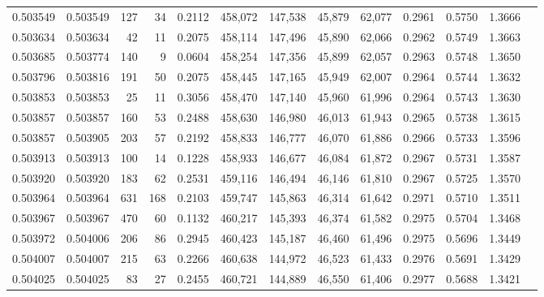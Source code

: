 \begin{tabular}{rrrrrrrrrrrrr}
0.503549 & 0.503549 &   127 &    34 &                                     0.2112 & 458,072 & 147,538 &  45,879 &  62,077 & 0.2961 & 0.5750 & 1.3666 \\
0.503634 & 0.503634 &    42 &    11 &                                     0.2075 & 458,114 & 147,496 &  45,890 &  62,066 & 0.2962 & 0.5749 & 1.3663 \\
0.503685 & 0.503774 &   140 &     9 &                                     0.0604 & 458,254 & 147,356 &  45,899 &  62,057 & 0.2963 & 0.5748 & 1.3650 \\
0.503796 & 0.503816 &   191 &    50 &                                     0.2075 & 458,445 & 147,165 &  45,949 &  62,007 & 0.2964 & 0.5744 & 1.3632 \\
0.503853 & 0.503853 &    25 &    11 &                                     0.3056 & 458,470 & 147,140 &  45,960 &  61,996 & 0.2964 & 0.5743 & 1.3630 \\
0.503857 & 0.503857 &   160 &    53 &                                     0.2488 & 458,630 & 146,980 &  46,013 &  61,943 & 0.2965 & 0.5738 & 1.3615 \\
0.503857 & 0.503905 &   203 &    57 &                                     0.2192 & 458,833 & 146,777 &  46,070 &  61,886 & 0.2966 & 0.5733 & 1.3596 \\
0.503913 & 0.503913 &   100 &    14 &                                     0.1228 & 458,933 & 146,677 &  46,084 &  61,872 & 0.2967 & 0.5731 & 1.3587 \\
0.503920 & 0.503920 &   183 &    62 &                                     0.2531 & 459,116 & 146,494 &  46,146 &  61,810 & 0.2967 & 0.5725 & 1.3570 \\
0.503964 & 0.503964 &   631 &   168 &                                     0.2103 & 459,747 & 145,863 &  46,314 &  61,642 & 0.2971 & 0.5710 & 1.3511 \\
0.503967 & 0.503967 &   470 &    60 &                                     0.1132 & 460,217 & 145,393 &  46,374 &  61,582 & 0.2975 & 0.5704 & 1.3468 \\
0.503972 & 0.504006 &   206 &    86 &                                     0.2945 & 460,423 & 145,187 &  46,460 &  61,496 & 0.2975 & 0.5696 & 1.3449 \\
0.504007 & 0.504007 &   215 &    63 &                                     0.2266 & 460,638 & 144,972 &  46,523 &  61,433 & 0.2976 & 0.5691 & 1.3429 \\
0.504025 & 0.504025 &    83 &    27 &                                     0.2455 & 460,721 & 144,889 &  46,550 &  61,406 & 0.2977 & 0.5688 & 1.3421 \\

\end{tabular}
